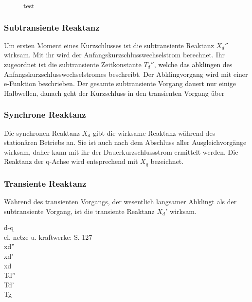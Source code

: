 \documentclass{scrartcl}
\begin{document}
\begin{onehalfspace}
\begin{figure}[H]
	\caption{test}
	\end{figure}


\subsubsection{Subtransiente Reaktanz}
Um ersten Moment eines Kurzschlusses ist die subtransiente Reaktanz $X_d''$ wirksam. Mit ihr wird der Anfangskurzschlusswechselstrom berechnet. Ihr zugeordnet ist die subtransiente Zeitkonstante $T_d''$, welche das abklingen des Anfangskurzschlusswechselstromes beschreibt. Der Abklingvorgang wird mit einer e-Funktion beschrieben. Der gesamte subtransiente Vorgang dauert nur einige Halbwellen, danach geht der Kurzschluss in den transienten Vorgang über

\subsubsection{Synchrone Reaktanz}
Die synchronen Reaktanz $X_d$ gibt die wirksame Reaktanz während des stationären Betriebs an. Sie ist auch nach dem Abschluss aller Ausgleichvorgänge wirksam, daher kann mit ihr der Dauerkurzschlussstrom ermittelt werden. Die Reaktanz der q-Achse wird entsprechend mit $X_q$ bezeichnet.

\subsubsection{Transiente Reaktanz}
Während des transienten Vorgangs, der wesentlich langsamer Abklingt als der subtransiente Vorgang, ist die transiente Reaktanz $X_d'$ wirksam.


d-q \\
el. netze u. kraftwerke: S. 127 \\
xd'' \\
xd' \\
xd \\
Td'' \\
Td' \\
Tg \\


\end{onehalfspace}
\end{document}
